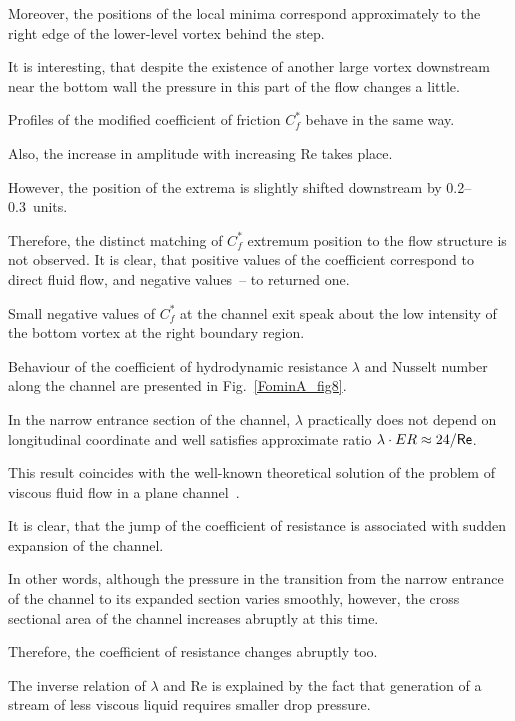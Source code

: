 Moreover, the positions of the local minima correspond approximately to the right edge of the lower-level vortex behind the step. 

It is interesting, that despite the existence of another large vortex downstream near the bottom wall the pressure in this part of the flow changes a little.



Profiles of the modified coefficient of friction  $C_f^*$ behave in the same way. 

Also, the increase in amplitude with increasing {\sf Re} takes place. 

However, the position of the extrema is slightly shifted downstream by 0.2--0.3~units. 

Therefore, the distinct matching of $C_f^*$ extremum position to the flow structure is not observed. It is clear, that positive values of the coefficient correspond to direct fluid flow, and negative values~-- to returned one.

Small negative values of $C_f^*$ at the channel exit speak about the low intensity of the bottom vortex at the right boundary region.







Behaviour of the coefficient of hydrodynamic resistance $\lambda$ and Nusselt number along the channel are presented in Fig.~\ref{FominA_fig8}. 

In the narrow entrance section of the channel, $\lambda$ practically does not depend on longitudinal coordinate and well satisfies approximate ratio \mbox{$\lambda\cdot ER \approx 24 / {\sf Re}$}. 

This result coincides with the well-known theoretical solution of the problem of viscous fluid flow in a plane channel~\cite{Loits}. 







It is clear, that the jump of the coefficient of resistance is associated with sudden expansion of the channel. 

In other words, although the pressure in the transition from the narrow entrance of the channel to its expanded section varies smoothly, however, the cross sectional area of the channel increases abruptly at this time.

Therefore, the coefficient of resistance changes abruptly too. 

The inverse relation of $\lambda$ and {\sf Re} is explained by the fact that generation of a stream of less viscous liquid requires smaller drop pressure.



